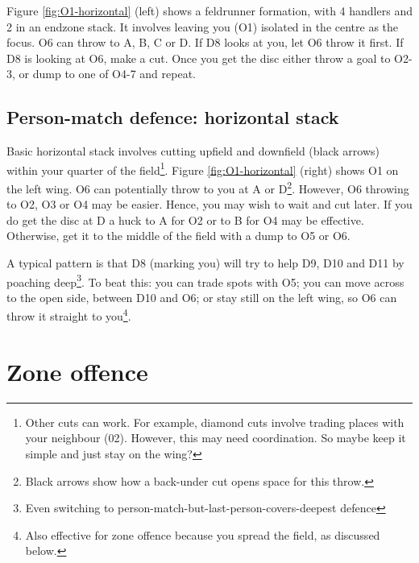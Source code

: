 \documentclass{tufte-handout}
\begin{document}
Figure \ref{fig:O1-horizontal} (left) 
shows a feldrunner formation, 
with 4 handlers
and 2 in an 
endzone stack.
It involves 
leaving you 
(O1) 
isolated 
in the centre
as the focus. 
O6 can throw 
to A,
B, 
C 
or D. 
If D8 looks at you, 
let O6 throw it first. 
If D8 is 
looking at O6, 
make a cut. 
Once you get the disc 
either throw a goal 
to O2-3, 
or dump to 
one of O4-7 
and repeat. 


\subsection{Person-match defence: horizontal stack}\label{sec:horizontall}
Basic horizontal stack 
involves cutting
upfield and downfield (black arrows)
within your quarter of the field\footnote{
Other cuts
can work. 
For example, 
diamond cuts 
involve trading places 
with your neighbour
(02). 
However, this may need
coordination. 
So maybe keep it simple 
and just stay on the wing?}. 
Figure \ref{fig:O1-horizontal} (right) shows 
O1 on the left wing. 
O6 
can potentially 
throw to you 
at A 
or D\footnote{
Black arrows
show how a back-under cut 
opens space 
for this throw.}. 
However, 
O6 throwing to 
O2, O3 or O4  
may be easier. 
Hence,  
you may wish to 
wait and 
cut later. 
If you do get the disc 
at D 
a huck to 
A for O2 or 
to B for O4 
may be effective.
Otherwise, 
get it to the middle of the field 
with a dump to O5 or O6. 

A typical pattern
is that D8 (marking you)
will try to help 
D9, D10 and D11 
by poaching deep\footnote{
Even switching to person-match-but-last-person-covers-deepest defence}. 
To beat this: 
you can trade spots with O5;
you can move across to the open side, 
between D10 and O6; or 
stay still 
on the left wing,
so O6 can throw it 
straight to you\footnote{
Also effective
for zone offence
because you spread the field,
as discussed below.}.

\section{Zone offence}\label{sec:zone}
\end{document}
